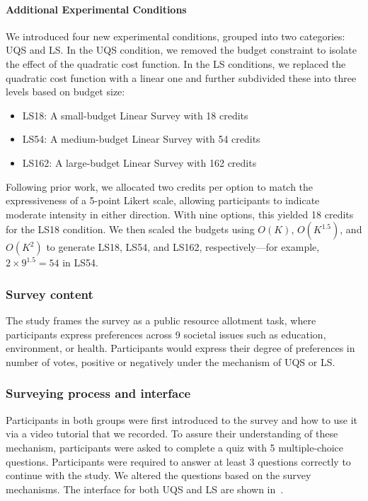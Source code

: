 \paragraph{Additional Experimental Conditions}
We introduced four new experimental conditions, grouped into two categories: UQS and LS. In the UQS condition, we removed the budget constraint to isolate the effect of the quadratic cost function. In the LS conditions, we replaced the quadratic cost function with a linear one and further subdivided these into three levels based on budget size:

\begin{itemize} 
    \item LS18: A small-budget Linear Survey with 18 credits
    \item LS54: A medium-budget Linear Survey with 54 credits
    \item LS162: A large-budget Linear Survey with 162 credits
\end{itemize}

Following prior work, we allocated two credits per option to match the expressiveness of a 5-point Likert scale, allowing participants to indicate moderate intensity in either direction. With nine options, this yielded 18 credits for the LS18 condition. We then scaled the budgets using $O(K)$, $O(K^{1.5})$, and $O(K^2)$ to generate LS18, LS54, and LS162, respectively—for example, $2 \times 9^{1.5} = 54$ in LS54.

\subsubsection{Survey content}
The study frames the survey as a public resource allotment task, where participants express preferences across 9 societal issues such as education, environment, or health. Participants would express their degree of preferences in number of votes, positive or negatively under the mechanism of UQS or LS.

\subsubsection{Surveying process and interface}
Participants in both groups were first introduced to the survey and how to use it via a video tutorial that we recorded. To assure their understanding of these mechanism, participants were asked to complete a quiz with 5 multiple-choice questions. Participants were required to answer at least 3 questions correctly to continue with the study. We altered the questions based on the survey mechanisms. The interface for both UQS and LS are shown in~.

